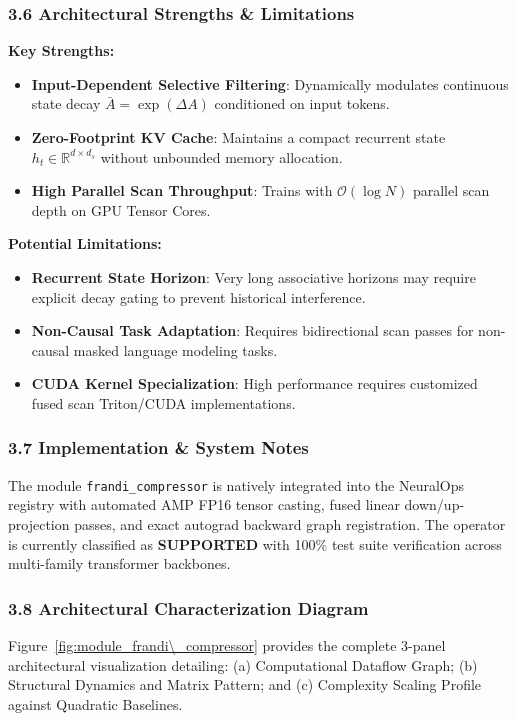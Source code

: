 \subsubsection*{3.6 Architectural Strengths \& Limitations}
\textbf{Key Strengths:}
\begin{itemize}
    \item \textbf{Input-Dependent Selective Filtering}: Dynamically modulates continuous state decay $\bar{A} = \exp(\Delta A)$ conditioned on input tokens.
    \item \textbf{Zero-Footprint KV Cache}: Maintains a compact recurrent state $h_t \in \mathbb{R}^{d \times d_s}$ without unbounded memory allocation.
    \item \textbf{High Parallel Scan Throughput}: Trains with $\mathcal{O}(\log N)$ parallel scan depth on GPU Tensor Cores.
\end{itemize}

\textbf{Potential Limitations:}
\begin{itemize}
    \item \textbf{Recurrent State Horizon}: Very long associative horizons may require explicit decay gating to prevent historical interference.
    \item \textbf{Non-Causal Task Adaptation}: Requires bidirectional scan passes for non-causal masked language modeling tasks.
    \item \textbf{CUDA Kernel Specialization}: High performance requires customized fused scan Triton/CUDA implementations.
\end{itemize}

\subsubsection*{3.7 Implementation \& System Notes}
The module \texttt{frandi\_compressor} is natively integrated into the NeuralOps registry with automated AMP FP16 tensor casting, fused linear down/up-projection passes, and exact autograd backward graph registration. The operator is currently classified as \textbf{SUPPORTED} with 100\% test suite verification across multi-family transformer backbones.

\subsubsection*{3.8 Architectural Characterization Diagram}
Figure~\ref{fig:module_frandi\_compressor} provides the complete 3-panel architectural visualization detailing: (a) Computational Dataflow Graph; (b) Structural Dynamics and Matrix Pattern; and (c) Complexity Scaling Profile against Quadratic Baselines.

